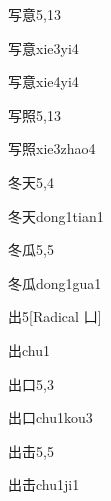 \begin{entry}{写意}{5,13}
  \begin{phonetics}{写意}{xie3yi4}
  \end{phonetics}
  \begin{phonetics}{写意}{xie4yi4}
  \end{phonetics}
\end{entry}

\begin{entry}{写照}{5,13}
  \begin{phonetics}{写照}{xie3zhao4}
  \end{phonetics}
\end{entry}

\begin{entry}{冬天}{5,4}
  \begin{phonetics}{冬天}{dong1tian1}
  \end{phonetics}
\end{entry}

\begin{entry}{冬瓜}{5,5}
  \begin{phonetics}{冬瓜}{dong1gua1}
  \end{phonetics}
\end{entry}

\begin{entry}{出}{5}[Radical ⼐]
  \begin{phonetics}{出}{chu1}
  \end{phonetics}
\end{entry}

\begin{entry}{出口}{5,3}
  \begin{phonetics}{出口}{chu1kou3}
  \end{phonetics}
\end{entry}

\begin{entry}{出击}{5,5}
  \begin{phonetics}{出击}{chu1ji1}
  \end{phonetics}
\end{entry}


